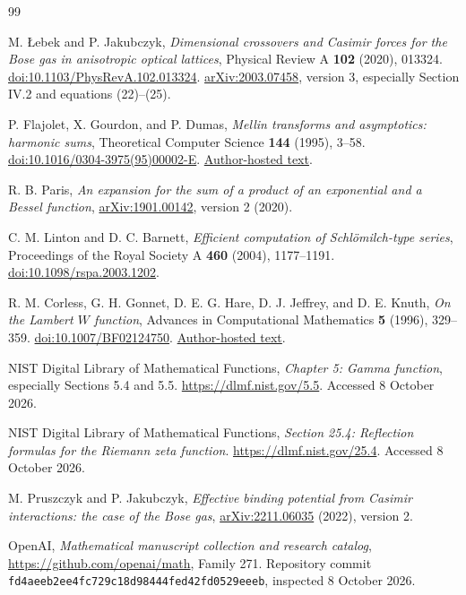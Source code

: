 \documentclass[11pt,a4paper]{article}
\numberwithin{equation}{section}
\theoremstyle{definition}
\begin{document}
\begin{thebibliography}{99}

M. Łebek and P. Jakubczyk,
\emph{Dimensional crossovers and Casimir forces for the Bose gas in
anisotropic optical lattices}, Physical Review A \textbf{102} (2020),
013324. \href{https://doi.org/10.1103/PhysRevA.102.013324}{doi:10.1103/PhysRevA.102.013324}.
\href{https://arxiv.org/abs/2003.07458}{arXiv:2003.07458}, version 3,
especially Section IV.2 and equations (22)--(25).

P. Flajolet, X. Gourdon, and P. Dumas,
\emph{Mellin transforms and asymptotics: harmonic sums},
Theoretical Computer Science \textbf{144} (1995), 3--58.
\href{https://doi.org/10.1016/0304-3975(95)00002-E}{doi:10.1016/0304-3975(95)00002-E}.
\href{https://specfun.inria.fr/dumas/Publications/FlGoDu95.pdf}{Author-hosted text}.

R. B. Paris,
\emph{An expansion for the sum of a product of an exponential and a
Bessel function}, \href{https://arxiv.org/abs/1901.00142}{arXiv:1901.00142},
version 2 (2020).

C. M. Linton and D. C. Barnett,
\emph{Efficient computation of Schlömilch-type series},
Proceedings of the Royal Society A \textbf{460} (2004), 1177--1191.
\href{https://doi.org/10.1098/rspa.2003.1202}{doi:10.1098/rspa.2003.1202}.

R. M. Corless, G. H. Gonnet, D. E. G. Hare, D. J. Jeffrey, and D. E. Knuth,
\emph{On the Lambert $W$ function}, Advances in Computational
Mathematics \textbf{5} (1996), 329--359.
\href{https://doi.org/10.1007/BF02124750}{doi:10.1007/BF02124750}.
\href{https://cs.uwaterloo.ca/research/tr/1993/03/W.pdf}{Author-hosted text}.

NIST Digital Library of Mathematical Functions,
\emph{Chapter 5: Gamma function}, especially Sections 5.4 and 5.5.
\url{https://dlmf.nist.gov/5.5}. Accessed 8 October 2026.

NIST Digital Library of Mathematical Functions,
\emph{Section 25.4: Reflection formulas for the Riemann zeta function}.
\url{https://dlmf.nist.gov/25.4}. Accessed 8 October 2026.

M. Pruszczyk and P. Jakubczyk,
\emph{Effective binding potential from Casimir interactions:
the case of the Bose gas},
\href{https://arxiv.org/abs/2211.06035}{arXiv:2211.06035} (2022), version 2.

OpenAI, \emph{Mathematical manuscript collection and research catalog},
\url{https://github.com/openai/math}, Family 271. Repository commit
\texttt{fd4aeeb2ee4fc729c18d98444fed42fd0529eeeb}, inspected 8 October 2026.


\end{thebibliography}
\end{document}
